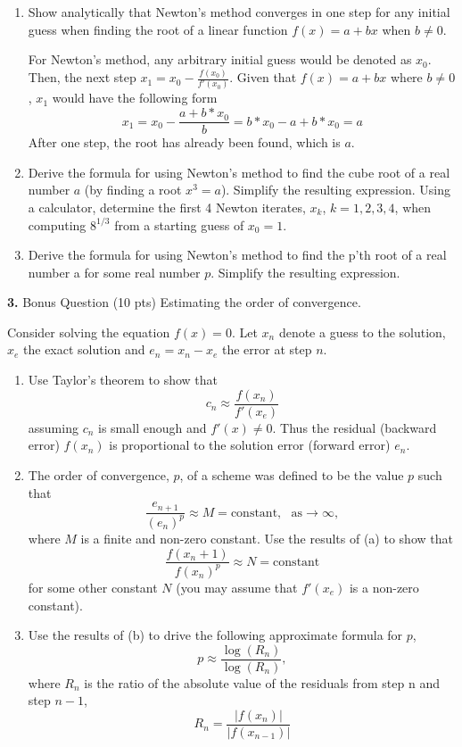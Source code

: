 \documentclass[10pt,letterpaper]{article}
\begin{document}
\begin{enumerate}

\item Show analytically that Newton’s method converges in one step for any initial guess when finding the root of a linear function $f(x) = a + bx$ when $b \neq 0$. 

\color{TangGreen}
For Newton's method, any arbitrary initial guess would be denoted as $x_{0}$. Then, the next step $x_{1} = x_{0} - \frac{f(x_{0})}{f'(x_{0})}$. Given that $f(x) = a + bx$ where $b \neq 0$, $x_{1}$ would have the following form
$$x_{1} = x_{0} - \frac{a + b*x_{0}}{b} = b*x_{0} - a + b * x_{0} = a$$
After one step, the root has already been found, which is $a$. 
\color{black}

\item Derive the formula for using Newton’s method to find the cube root of a real number $a$ (by finding a root $x^{3} = a$). Simplify the resulting expression. Using a calculator, determine the first 4 Newton iterates, $x_{k}$, $k = 1, 2, 3, 4$, when computing $8^{1/3}$ from a starting guess of $x_{0} = 1$. 

\color{TangGreen}

\color{black}

\item Derive the formula for using Newton’s method to find the p’th root of a real number a for some real number $p$. Simplify the resulting expression.

\end{enumerate}

\noindent\textbf{3.} Bonus Question (10 pts) Estimating the order of convergence.

Consider solving the equation $f(x) = 0$. Let $x_{n}$ denote a guess to the solution, $x_{e}$ the exact solution and $e_{n} = x_{n} - x_{e}$ the error at step $n$. 

\begin{enumerate}

\item Use Taylor's theorem to show that 
$$c_{n} \approx \frac{f(x_{n})}{f'(x_{e})}$$
assuming $c_{n}$ is small enough and $f'(x) \neq 0$. Thus the residual (backward error) $f(x_{n})$ is proportional to the solution error (forward error) $e_{n}$. 

\item The order of convergence, $p$, of a scheme was defined to be the value $p$ such that 
$$\frac{e_{n + 1}}{(e_{n})^{p}} \approx M = \text{constant},\ \ \ \text{as} \rightarrow \infty,$$
where $M$ is a finite and non-zero constant. Use the results of (a) to show that
$$\frac{f(x_{n} + 1)}{f(x_{n})^{p}} \approx N = \text{constant}$$
for some other constant $N$ (you may assume that $f'(x_{e})$ is a non-zero constant). 

\item Use the results of (b) to drive the following approximate formula for $p$,
$$p \approx \frac{\log(R_{n})}{\log(R_{n})},$$
where $R_{n}$ is the ratio of the absolute value of the residuals from step n and step $n - 1$,
$$R_{n} = \frac{|f(x_{n})|}{|f(x_{n - 1})|}$$

\end{enumerate}
\end{document}
